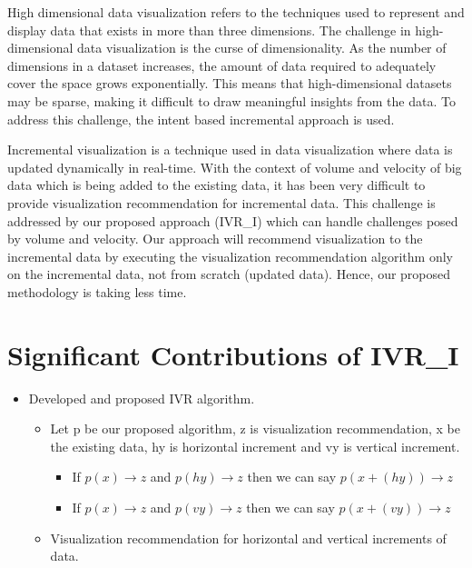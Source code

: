High dimensional data visualization refers to the techniques used to represent and display data that exists in more than three dimensions. The challenge in high-dimensional data visualization is the curse of dimensionality. As the number of dimensions in a dataset increases, the amount of data required to adequately cover the space grows exponentially. This means that high-dimensional datasets may be sparse, making it difficult to draw meaningful insights from the data. To address this challenge, the intent based incremental approach is used.

Incremental visualization is a technique used in data visualization where data is updated dynamically in real-time. With the context of volume and velocity of big data which is being added to the existing data, it has been very difficult to provide visualization recommendation for incremental data. This challenge is addressed by our proposed approach (IVR\_I) which can handle challenges posed by volume and velocity. Our approach will recommend visualization to the incremental data by executing the visualization recommendation algorithm only on the incremental data, not from scratch (updated data). Hence, our proposed methodology is taking less time.

\section{Significant Contributions of IVR\_I} 
\begin{itemize}
    \item Developed and proposed IVR algorithm.
    \begin{itemize}
        \item Let p be our proposed algorithm, z is visualization recommendation, x be the existing data, hy is horizontal increment and vy is vertical increment.
        \begin{itemize}
            \item If \( p(x) \rightarrow z\) and \(p(hy) \rightarrow z\) then we can say \(p(x+(hy)) \rightarrow z\)
            \item If \( p(x) \rightarrow z\) and \(p(vy) \rightarrow z\) then we can say \(p(x+(vy)) \rightarrow z\)
        \end{itemize}
        \item Visualization recommendation for horizontal and vertical increments of data.
    \end{itemize}
\end{itemize}

